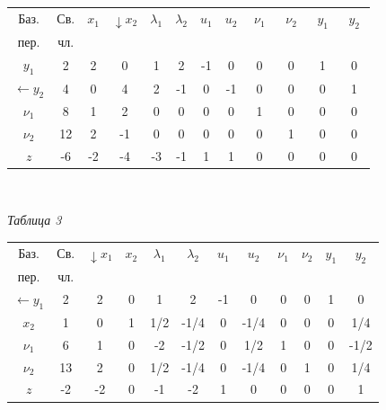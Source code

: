 {\begin{flushleft}
\begin{tabular}{|c|c|c|c|c|c|c|c|c|c|c|c|}
\hline
Баз.&Св.&$x_1$&$\downarrow x_2$&$\lambda_1$&$\lambda_2$&$u_1$&$u_2$&$\mspace{6mu}\nu_1\mspace{5mu}$&$\mspace{6mu}\nu_2\mspace{5mu}$&$\mspace{6mu}y_1\mspace{5mu}$&$\mspace{6mu}y_2\mspace{5mu}$\\
пер.&чл.& & & & & & & & & & \\
\hline
$y_1$&{\small 2}&{\small 2}&{\small 0}&{\small 1}&{\small 2}&{\small -1}&{\small 0}&{\small 0}&{\small 0}&{\small 1}&{\small 0}\\  [0.15cm]
\hline
$\leftarrow y_2$&{\small 4}&{\small 0}&{\small 4}&{\small 2}&{\small -1}&{\small 0}&{\small -1}&{\small 0}&{\small0 }&{\small 0}&{\small 1}\\ [0.15cm]
\hline
$\nu_1$&{\small 8}&{\small 1}&{\small 2}&{\small 0}&{\small 0}&{\small 0}&{\small 0}&{\small 1}&{\small 0}&{\small0}&{\small0}\\ [0.15cm]
\hline
$\nu_2$&{\small12}&{\small2}&{\small-1}&{\small0}&{\small0}&{\small0}&{\small0}&{\small0}&{\small1}&{\small0}&{\small0}\\[0.19cm]
\hline
$z$&{\small-6}&{\small-2}&{\small-4}&{\small-3}&{\small-1}&{\small1}&{\small1}&{\small0}&{\small0}&{\small0}&{\small0}\\[0.19cm]
\hline
\end{tabular}\\
\end{flushleft}
\begin{flushright}\textit{Таблица 3}\end{flushright}

\begin{flushleft}
\begin{tabular}{|c|c|c|c|c|c|c|c|c|c|c|c|}
\hline
Баз.&Св.&$\downarrow x_1$&$ x_2$&$\lambda_1$&$\lambda_2$&$u_1$&$u_2$&$\nu_1$&$\nu_2$&$y_1$&$y_2$\\
пер.&чл.& & & & & & & & & & \\
\hline
$\leftarrow y_1$&{\small2}&{\small2}&{\small0}&{\small1}&{\small2}&{\small-1}&{\small0}&{\small0}&{\small0}&{\small1}&{\small0}\\  [0.15cm]
\hline
$x_2$&{\small1}&{\small0}&{\small1}&{\small1/2}&{\small-1/4}&{\small0}&{\small-1/4}&{\small0}&{\small0}&{\small0}&{\small1/4}\\ [0.15cm]
\hline
$\nu_1$&{\small6}&{\small1}&{\small0}&{\small-2}&{\small-1/2}&{\small0}&{\small1/2}&{\small1}&{\small0}&{\small0}&{\small-1/2}\\ [0.15cm]
\hline
$\nu_2$&{\small13}&{\small2}&{\small0}&{\small1/2}&{\small-1/4}&{\small0}&{\small-1/4}&{\small0}&{\small1}&{\small0}&{\small1/4}\\[0.19cm]
\hline
$z$&{\small-2}&{\small-2}&{\small0}&{\small-1}&{\small-2}&{\small1}&{\small0}&{\small0}&{\small0}&{\small0}&{\small1}\\[0.19cm]
\hline
\end{tabular}
\end{flushleft}

}
